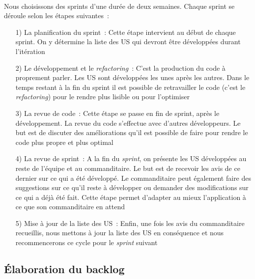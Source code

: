 			\paragraph{}%
			Nous choisissons des sprints d'une durée de deux semaines. Chaque sprint se
			déroule selon les étapes suivantes~:
			\begin{itemize}
			  \item[1) La planification du sprint~:] Cette étape intervient au début de
			  chaque sprint. On y détermine la liste des US qui devront être
			  développées durant l'itération
			  \item[2) Le développement et le \textit{refactoring}~:] C'est la production
			  du code à proprement parler. Les US sont développées les unes après les
			  autres. Dans le temps restant à la fin du sprint il est possible de
			  retravailler le code (c'est le \textit{refactoring}) pour le rendre plus
			  lisible ou pour l'optimiser
			  \item[3) La revue de code~:] Cette étape se passe en fin de sprint, après
			  le développement. La revue du code s'effectue avec d'autres développeurs.
			  Le but est de discuter des améliorations qu'il est possible de faire pour
			  rendre le code plus propre et plus optimal
			  \item[4) La revue de sprint~:] A la fin du \textit{sprint}, on présente les
			  US développées au reste de l'équipe et au commanditaire. Le but est de
			  recevoir les avis de ce dernier sur ce qui a été développé. Le
			  commanditaire peut également faire des suggestions sur ce qu'il reste à
			  développer ou demander des modifications sur ce qui a déjà été fait. Cette
			  étape permet d'adapter au mieux l'application à ce que son commanditaire en
			  attend
			  \item[5) Mise à jour de la liste des US~:] Enfin, une fois les
			  avis du commanditaire recueillis, nous mettons à jour la liste des US en
			  conséquence et nous recommencerons ce cycle pour le \textit{sprint} suivant
			\end{itemize}
		
		\subsection{Élaboration du backlog}
